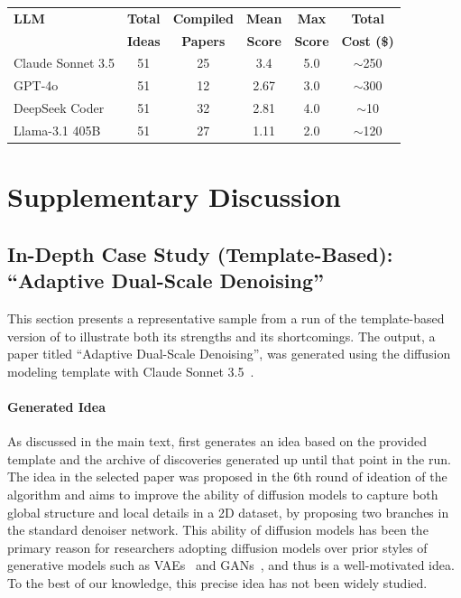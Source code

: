 \begin{appendices}
\begin{table}[!h]
\begin{tabular}{@{}l|c|c|c|c|c@{}}
\toprule
\textbf{LLM} & \textbf{Total} & \textbf{Compiled} & \textbf{Mean} & \textbf{Max} & \textbf{Total} \\
 & \textbf{Ideas} & \textbf{Papers} & \textbf{Score} & \textbf{Score} & \textbf{Cost (\$)} \\ \midrule
Claude Sonnet 3.5     & 51 & 25 & 3.4 & 5.0 & $\sim$250 \\
GPT-4o         & 51 &  12 & 2.67 & 3.0 & $\sim$300 \\
DeepSeek Coder & 51 &  32 & 2.81 & 4.0 & $\sim$10   \\
Llama-3.1 405B & 51 &  27 & 1.11 & 2.0 & $\sim$120 \\
\bottomrule
\end{tabular}

\end{table}


\clearpage

\section{Supplementary Discussion}
\label{app:discussion}

\subsection{In-Depth Case Study (Template-Based): ``Adaptive Dual-Scale Denoising''}
\label{app:case_study_v1}
This section presents a representative sample from a run of the template-based version of \ouralgo to illustrate both its strengths and its shortcomings.
The output, a paper titled ``Adaptive Dual-Scale Denoising'', was generated using the diffusion modeling template with Claude Sonnet 3.5~\citep{claude3}.

\paragraph{Generated Idea}
As discussed in the main text, \ouralgo first generates an idea based on the provided template and the archive of discoveries generated up until that point in the run.
The idea in the selected paper was proposed in the 6th round of ideation of the algorithm and aims to improve the ability of diffusion models to capture both global structure and local details in a 2D dataset, by proposing two branches in the standard denoiser network. This ability of diffusion models has been the primary reason for researchers adopting diffusion models over prior styles of generative models such as VAEs~\citep{vae} and GANs~\citep{gan}, and thus is a well-motivated idea.
To the best of our knowledge, this precise idea has not been widely studied.


\end{appendices}
